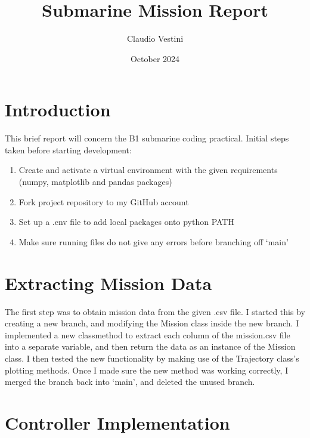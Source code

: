 \documentclass[hidelinks]{article}
\title{Submarine Mission Report}
\author{Claudio Vestini}
\date{October 2024}
\begin{document}
\maketitle
%
\section{Introduction}
This brief report will concern the B1 submarine coding practical.
Initial steps taken before starting development:
\begin{enumerate}
    \item Create and activate a virtual environment with the given requirements (numpy, matplotlib and pandas packages)
    \item Fork project repository to my GitHub account
    \item Set up a .env file to add local packages onto python PATH
    \item Make sure running files do not give any errors before branching off `main'
\end{enumerate}
%
\section{Extracting Mission Data}
The first step was to obtain mission data from the given .csv file. I started this by creating a new branch, and modifying the Mission class inside the new branch. I implemented a new classmethod to extract each column of the mission.csv file into a separate variable, and then return the data as an instance of the Mission class. I then tested the new functionality by making use of the Trajectory class's plotting methods. Once I made sure the new method was working correctly, I merged the branch back into `main', and deleted the unused branch.
%
\section{Controller Implementation}
%
\end{document}
